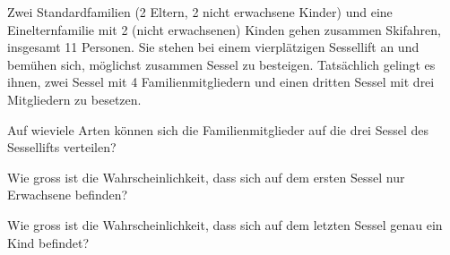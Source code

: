 Zwei Standardfamilien (2 Eltern, 2 nicht erwachsene Kinder) und eine
Einelternfamilie mit 2 (nicht erwachsenen) Kinden gehen zusammen Skifahren,
insgesamt 11 Personen.
Sie stehen bei einem vierplätzigen Sessellift an und bemühen sich,
möglichst zusammen Sessel zu besteigen. Tatsächlich gelingt es
ihnen, zwei Sessel mit 4 Familienmitgliedern und einen dritten
Sessel mit drei Mitgliedern zu besetzen.
\begin{teilaufgaben}
\item Auf wieviele Arten können sich die Familienmitglieder auf
die drei Sessel des Sessellifts verteilen?
\item
Wie gross ist die Wahrscheinlichkeit, dass sich auf dem ersten
Sessel nur Erwachsene befinden?
\item
Wie gross ist die Wahrscheinlichkeit, dass sich auf dem letzten Sessel
genau ein Kind befindet?
\end{teilaufgaben}

